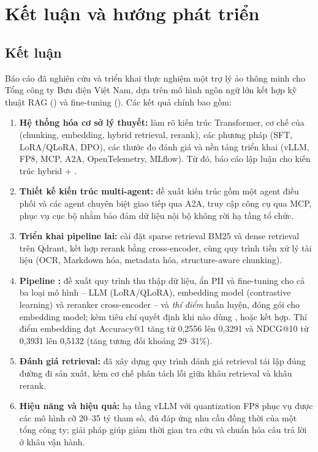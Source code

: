 \chapter{Kết luận và hướng phát triển}
\label{ch:ketluan}

\section{Kết luận}

Báo cáo đã nghiên cứu và triển khai thực nghiệm một trợ lý ảo thông minh cho Tổng công ty
Bưu điện Việt Nam, dựa trên mô hình ngôn ngữ lớn kết hợp kỹ thuật RAG
(\rag) và fine-tuning (\ft). Các kết quả chính bao gồm:

\begin{enumerate}
  \item \textbf{Hệ thống hóa cơ sở lý thuyết:} làm rõ kiến trúc Transformer, cơ chế của
  \rag{} (chunking, embedding, hybrid retrieval, rerank), các phương pháp \ft{}
  (SFT, LoRA/QLoRA, DPO), các thước đo đánh giá và nền tảng triển khai (vLLM, FP8, MCP, A2A,
  OpenTelemetry, MLflow). Từ đó, báo cáo lập luận cho kiến trúc hybrid \rag{} + \ft.
  \item \textbf{Thiết kế kiến trúc multi-agent:} đề xuất kiến trúc gồm một agent điều phối và
  các agent chuyên biệt giao tiếp qua A2A, truy cập công cụ qua MCP, phục vụ cục bộ nhằm
  bảo đảm dữ liệu nội bộ không rời hạ tầng tổ chức.
  \item \textbf{Triển khai pipeline \rag{} lai:} cài đặt sparse retrieval BM25 và dense retrieval
  trên Qdrant, kết hợp rerank bằng cross-encoder, cùng quy trình tiền xử lý tài liệu
  (OCR, Markdown hóa, metadata hóa, structure-aware chunking).
  \item \textbf{Pipeline \ft:} đề xuất quy trình thu thập dữ liệu, ẩn PII và fine-tuning cho
  cả ba loại mô hình -- LLM (LoRA/QLoRA), embedding model (contrastive learning) và reranker
  cross-encoder -- và \emph{thí điểm} huấn luyện, đóng gói cho embedding model; kèm tiêu chí
  quyết định khi nào dùng \rag, \ft{} hoặc kết hợp. Thí điểm embedding đạt Accuracy@1 tăng từ
  0,2556 lên 0,3291 và NDCG@10 từ 0,3931 lên 0,5132 (tăng tương đối khoảng 29--31\%).
  \item \textbf{Đánh giá retrieval:} đã xây dựng quy trình đánh giá retrieval tái lập đúng
  đường đi sản xuất, kèm cơ chế phân tách lỗi giữa khâu retrieval và khâu rerank.
  \item \textbf{Hiệu năng và hiệu quả:} hạ tầng vLLM với quantization FP8 phục vụ được các
  mô hình cỡ 20--35 tỷ tham số, đủ đáp ứng nhu cầu đồng thời của một tổng công ty; giải
  pháp giúp giảm thời gian tra cứu và chuẩn hóa câu trả lời ở khâu vận hành.
\end{enumerate}

